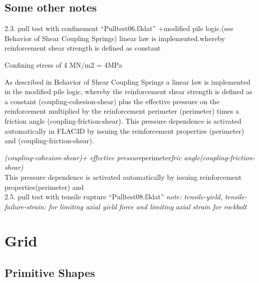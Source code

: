 \documentclass[a4paper, nobind]{templates/ociamthesis}
\begin{document}
\hypertarget{some-other-notes}{%
\section{Some other notes}\label{some-other-notes}}

2.3. pull test with confinement ``Pulltest06.f3dat'' +modified pile
logic.(see Behavior of Shear Coupling Springs) linear law is
implemented.whereby reinforcement shear strength is defined as constant

Confining stress of 4 MN/m2 = 4MPa

As described in Behavior of Shear Coupling Springs a linear law is
implemented in the modified
pile logic, whereby the reinforcement shear strength is defined as a
constant
(coupling-cohesion-shear) plus the effective pressure
on the reinforcement multiplied by the reinforcement perimeter
(perimeter) times a friction angle (coupling-friction-shear). This
pressure dependence is
activated automatically in FLAC3D by issuing the
reinforcement properties (perimeter) and (coupling-friction-shear).

\hfill\break
\emph{(coupling-cohesion-shear)+ effective pressure}perimeter\emph{fric
angle(coupling-friction-shear)}\\
This pressure dependence is activated automatically by issuing
reinforcement properties(perimeter) and\\

2.5. pull test with tensile rupture ``Pulltest08.f3dat'' \emph{note:
tensile-yield, tensile-failure-strain: for limiting axial yield force
and limiting axial strain for rockbolt}

\hypertarget{grid}{%
\chapter{Grid}\label{grid}}

\hypertarget{primitive-shapes}{%
\section{Primitive Shapes}\label{primitive-shapes}}
\end{document}
